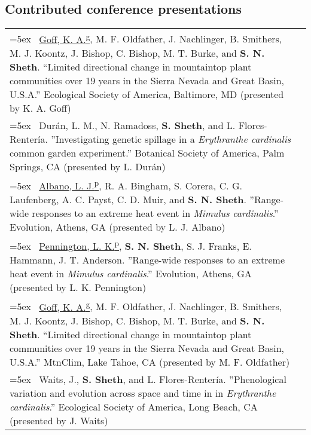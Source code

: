 \documentclass[11pt,english]{article}
\providecommand{\tabularnewline}{\\}
\begin{document}
\subsection*{Contributed conference presentations} %
\enlargethispage{5\baselineskip} %
\vspace{-1ex}

\renewcommand{\arraystretch}{1.2}
\begin{tabularx}{\textwidth}{@{}>{\raggedright}p{5.25in} >{\raggedleft}X@{}}

\hangindent=5ex \ \underline{Goff, K. A.\textsuperscript{g}}, M. F. Oldfather, J. Nachlinger, B. Smithers, M. J. Koontz, J. Bishop, C. Bishop, M. T. Burke, and \textbf{S. N. Sheth}. ``Limited directional change in mountaintop plant communities over 19 years in the
Sierra Nevada and Great Basin, U.S.A.'' Ecological Society of America, Baltimore, MD (presented by K. A. Goff) & 2025 \tabularnewline

\hangindent=5ex \ Durán, L. M., N. Ramadoss, \textbf{S. Sheth}, and L. Flores-Renter\'{i}a. ''Investigating genetic spillage in a \emph{Erythranthe cardinalis} common garden experiment.'' Botanical Society of America, Palm Springs, CA (presented by L. Durán) & 2025 \tabularnewline

\hangindent=5ex \ \underline{Albano, L. J.\textsuperscript{p}}, R. A. Bingham, S. Corera, C. G.  Laufenberg, A. C. Payst, C. D. Muir, and \textbf{S. N. Sheth}. ''Range-wide responses to an extreme heat event in \emph{Mimulus cardinalis}.'' Evolution, Athens, GA (presented by L. J. Albano) & 2025 \tabularnewline

\hangindent=5ex \ \underline{Pennington, L. K.\textsuperscript{p}}, \textbf{S. N. Sheth}, S. J. Franks, E. Hammann, J. T. Anderson. ''Range-wide responses to an extreme heat event in \emph{Mimulus cardinalis}.'' Evolution, Athens, GA (presented by L. K. Pennington) & 2025 \tabularnewline

\hangindent=5ex \ \underline{Goff, K. A.\textsuperscript{g}}, M. F. Oldfather, J. Nachlinger, B. Smithers, M. J. Koontz, J. Bishop, C. Bishop, M. T. Burke, and \textbf{S. N. Sheth}. ``Limited directional change in mountaintop plant communities over 19 years in the
Sierra Nevada and Great Basin, U.S.A.'' MtnClim, Lake Tahoe, CA (presented by M. F. Oldfather) & 2024 \tabularnewline

\hangindent=5ex \ Waits, J., \textbf{S. Sheth}, and L. Flores-Renter\'{i}a. ''Phenological variation and evolution across space and time in in \emph{Erythranthe cardinalis}.'' Ecological Society of America, Long Beach, CA (presented by J. Waits) & 2024 \tabularnewline

\end{tabularx}
\end{document}
